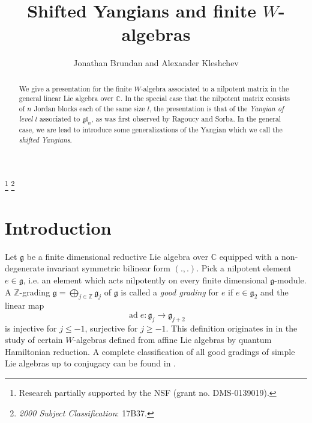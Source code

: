 \documentclass[twoside,12pt,reqno]{amsart}
\def\C{{\mathbb C}}
\def\Z{{\mathbb Z}}
\def\ad{\operatorname{ad}}
\begin{document}
\title[Shifted Yangians and finite $W$-algebras]{\boldmath 
Shifted Yangians and finite $W$-algebras}
\author{Jonathan Brundan and Alexander Kleshchev}
\address
{Department of Mathematics\\ University of Oregon\\
Eugene\\ OR~97403, USA}
\thanks{Research partially supported by the NSF (grant no. DMS-0139019).}
\thanks{
{\em 2000 Subject Classification}: 17B37.}

\begin{abstract}
We give a presentation for the finite $W$-algebra
associated to a nilpotent matrix in the general linear
Lie algebra over $\C$. In the special case that
the nilpotent matrix consists of $n$ Jordan blocks each
of the same size $l$,
the presentation is that of the {\em Yangian of level $l$}
associated to $\mathfrak{gl}_n$,
as was first observed by Ragoucy and Sorba. In the general case,
we are lead to introduce some generalizations of the Yangian
which we call the {\em shifted Yangians}.
\end{abstract}

\maketitle

\section{Introduction}\label{sintro}

Let $\mathfrak{g}$ be a finite dimensional reductive Lie
algebra over $\C$ equipped with a non-degenerate
invariant symmetric bilinear form $(.,.)$. 
Pick a nilpotent element $e \in \mathfrak{g}$, i.e. an element which
acts nilpotently on every finite dimensional $\mathfrak{g}$-module.
A $\Z$-grading $\mathfrak{g} = \bigoplus_{j \in \Z}
\mathfrak{g}_j$ of $\mathfrak{g}$ is called
a {\em good grading} for $e$ if $e \in \mathfrak{g}_2$ and  
the linear map $$
\ad e: \mathfrak{g}_j \rightarrow \mathfrak{g}_{j+2}
$$
is injective for $j \leq -1$, surjective for $j \geq -1$.
This definition originates in \cite{KRW} in the study
of certain $W$-algebras 
defined from affine Lie algebras by quantum Hamiltonian reduction.
A complete classification of all good gradings of
simple Lie algebras up to conjugacy can be found in
\cite{EK}. 
\end{document}
